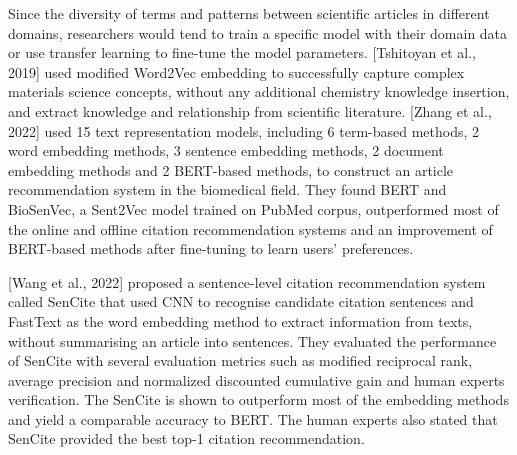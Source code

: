 Since the diversity of terms and patterns between scientific articles in different domains, researchers would tend to train a specific model with their domain data or use transfer learning to fine-tune the model parameters.
[Tshitoyan et al., 2019] used modified Word2Vec embedding to successfully capture complex materials science concepts, without any additional chemistry knowledge insertion, and extract knowledge and relationship from scientific literature.
[Zhang et al., 2022] used 15 text representation models, including 6 term-based methods, 2 word embedding methods, 3 sentence embedding methods, 2 document embedding methods and 2 BERT-based methods, to construct an article recommendation system in the biomedical field.
They found BERT and BioSenVec, a Sent2Vec model trained on PubMed corpus, outperformed most of the online and offline citation recommendation systems and an improvement of BERT-based methods after fine-tuning to learn users' preferences.

[Wang et al., 2022] proposed a sentence-level citation recommendation system called SenCite that used CNN to recognise candidate citation sentences and FastText as the word embedding method to extract information from texts, without summarising an article into sentences.
They evaluated the performance of SenCite with several evaluation metrics such as modified reciprocal rank, average precision and normalized discounted cumulative gain and human experts verification.
The SenCite is shown to outperform most of the embedding methods and yield a comparable accuracy to BERT.
The human experts also stated that SenCite provided the best top-1 citation recommendation.
